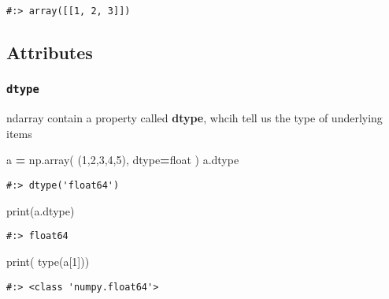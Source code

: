 \documentclass[
]{book}
\newenvironment{Shaded}{\begin{snugshade}}{\end{snugshade}}
\newcommand{\BuiltInTok}[1]{#1}
\newcommand{\DecValTok}[1]{\textcolor[rgb]{0.06,0.06,0.06}{#1}}
\newcommand{\NormalTok}[1]{#1}
\newcommand{\OperatorTok}[1]{\textcolor[rgb]{0.43,0.43,0.43}{\textbf{#1}}}
\newcommand{\StringTok}[1]{\textcolor[rgb]{0.5,0.5,0.5}{#1}}
\begin{document}
\begin{verbatim}
#:> array([[1, 2, 3]])
\end{verbatim}

\hypertarget{attributes-3}{%
\subsection{Attributes}\label{attributes-3}}

\hypertarget{dtype}{%
\subsubsection{\texorpdfstring{\texttt{dtype}}{dtype}}\label{dtype}}

ndarray contain a property called \textbf{dtype}, whcih tell us the type of underlying items

\begin{Shaded}
\begin{Highlighting}[]
\NormalTok{a }\OperatorTok{=}\NormalTok{ np.array( (}\DecValTok{1}\NormalTok{,}\DecValTok{2}\NormalTok{,}\DecValTok{3}\NormalTok{,}\DecValTok{4}\NormalTok{,}\DecValTok{5}\NormalTok{), dtype}\OperatorTok{=}\StringTok{\textquotesingle{}float\textquotesingle{}}\NormalTok{ )}
\NormalTok{a.dtype}
\end{Highlighting}
\end{Shaded}

\begin{verbatim}
#:> dtype('float64')
\end{verbatim}

\begin{Shaded}
\begin{Highlighting}[]
\BuiltInTok{print}\NormalTok{(a.dtype)}
\end{Highlighting}
\end{Shaded}

\begin{verbatim}
#:> float64
\end{verbatim}

\begin{Shaded}
\begin{Highlighting}[]
\BuiltInTok{print}\NormalTok{( }\BuiltInTok{type}\NormalTok{(a[}\DecValTok{1}\NormalTok{]))}
\end{Highlighting}
\end{Shaded}

\begin{verbatim}
#:> <class 'numpy.float64'>
\end{verbatim}
\end{document}
